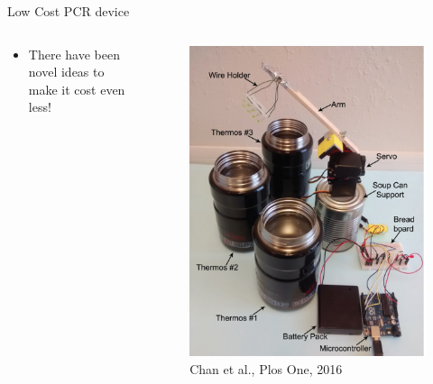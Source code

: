 \documentclass[UKenglish, aspectratio = 169]{beamer}
\begin{document}
\begin{frame}{Low Cost PCR device}
	\begin{columns}
		\begin{column}[T]{0.5\textwidth}
			\vspace*{4ex}
			\begin{itemize}
				\item There have been novel ideas to make it cost even less!
			\end{itemize}
		\end{column}
		\begin{column}{0.5\textwidth}
			\begin{figure}
				\centering
				\includegraphics[scale=0.25]{figs/pcr2.png}
				\caption{\tiny{Chan et al., Plos One, 2016}}
			\end{figure}
		\end{column}
	\end{columns}
\end{frame}
\end{document}
